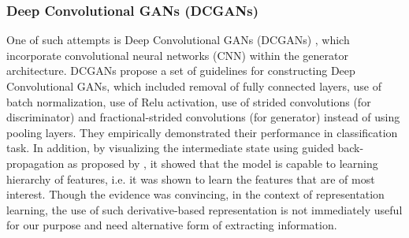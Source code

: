 \documentclass[11pt, letterpaper, oneside]{article}
\begin{document}
\subsubsection{Deep Convolutional GANs (DCGANs)} 
One of such attempts is Deep Convolutional GANs (DCGANs) \cite{radford_unsupervised_2016}, which incorporate convolutional neural networks (CNN) within the generator architecture. %
DCGANs propose a set of guidelines for constructing Deep Convolutional GANs, which included removal of fully connected layers, use of batch normalization, use of Relu activation, use of strided convolutions (for discriminator) and fractional-strided convolutions (for generator) instead of using pooling layers. 
They empirically demonstrated their performance in classification task. In addition, by visualizing the intermediate state using guided back-propagation as proposed by \cite{springenberg_striving_2015}, it showed that the model is capable to learning hierarchy of features, i.e. it was shown to learn the features that are of most interest. Though the evidence was convincing, in the context of representation learning, the use of such derivative-based representation is not immediately useful for our purpose and need alternative form of extracting information.

\end{document}
